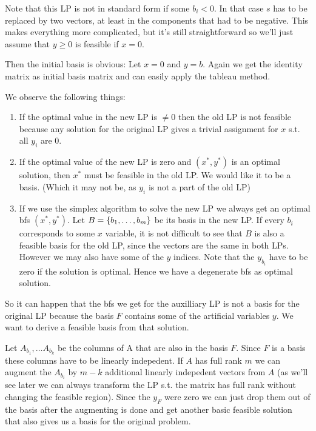 Note that this LP is not in standard form if some $b_i<0$. In that case $s$ has to be replaced by two vectors, at least in the components that had to be negative. This makes everything more complicated, but it's still straightforward so we'll just assume that $y\geq 0$ is feasible if $x=0$.

Then the initial basis is obvious: Let $x=0$ and $y=b$. Again we get the identity matrix as initial basis matrix and can easily apply the tableau method.

We observe the following things:

\begin{enumerate}
\item If the optimal value in the new LP is $\neq 0$ then the old LP is not feasible because any solution for the original LP gives a trivial assignment for $x$ s.t. all $y_i$ are 0.
\item If the optimal value of the new LP is zero and $(x^*, y^*)$ is an optimal solution, then $x^*$ must be feasible in the old LP. We would like it to be a basis. (Which it may not be, as $y_i$ is not a part of the old LP)
\item If we use the simplex algorithm to solve the new LP we always get an optimal bfs $(x^*,y^*)$. Let $B=\{{b}_1,\ldots,{b}_{m}\}$ be its basis in the new LP. If every $b_i$ corresponds to some $x$ variable, it is not difficult to see that $B$ is also a feasible basis for the old LP, since the vectors are the same in both LPs. However we may also have some of the $y$ indices. Note that the $y_{b_i}$ have to be zero if the solution is optimal. Hence we have a degenerate bfs as optimal solution.
\end{enumerate}

So it can happen that the bfs we get for the auxilliary LP is not a basis for the original LP because the basis $F$ contains some of the artificial variables $y$. We want to derive a feasible basis from that solution.

Let $A_{b_1},\ldots A_{b_k}$ be the columns of A that are also in the basis $F$. Since $F$ is a basis these columns have to be linearly indepedent. If $A$ has full rank $m$ we can augment the $A_{b_i}$ by $m-k$ additional linearly indepedent vectors from $A$ (as we'll see later we can always transform the LP s.t. the matrix has full rank without changing the feasible region). Since the $y_F$ were zero we can just drop them out of the basis after the augmenting is done and get another basic feasible solution that also gives us a basis for the original problem.

